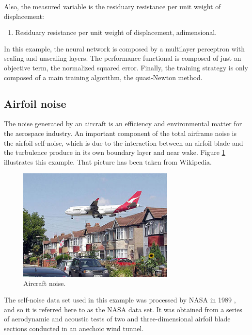 Also, the measured variable is the residuary resistance per unit weight of
displacement:

\begin{enumerate}
\item Residuary resistance per unit weight of displacement, adimensional.
\end{enumerate}

In this example, the neural network is composed by a multilayer perceptron with scaling and unscaling layers. 
The performance functional is composed of just an objective term, the normalized squared error. 
Finally, the training strategy is only composed of a main training algorithm, the quasi-Newton method. 

\subsection*{Airfoil noise}

The noise generated by an aircraft is an efficiency and
environmental matter for the aerospace industry. An important component of the total airframe noise is the airfoil
self-noise, which is due to the interaction between an airfoil blade
and the turbulence produce in its own boundary layer and near wake.
Figure \ref{AircraftNoiseFigure} illustrates this example. 
That picture has been taken from Wikipedia. 

\begin{figure}[!hbp]
\begin{center}
\includegraphics[width=0.7\textwidth]{function_regression/aircraft_noise.jpg}
\caption{Aircraft noise.}\label{AircraftNoiseFigure}
\end{center}
\end{figure}

The self-noise data set used in this example was processed by NASA in
1989 \cite{Brooks1989}, and so it is referred here to as the NASA
data set. It was obtained from a series of aerodynamic and acoustic
tests of two and three-dimensional airfoil blade sections conducted
in an anechoic wind tunnel. 

